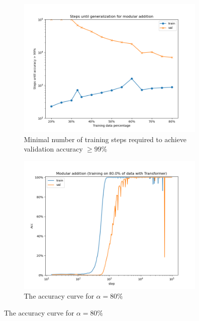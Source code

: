 \begin{figure}[!ht]
    \centering
    \begin{subfigure}[t]{0.3\textwidth}
        \includegraphics[width=\linewidth]{fig/Transformer_alpha/Transformer_alpha.png}
        \caption{Minimal number of training steps required to achieve validation accuracy $\geq 99\%$}
        \label{fig:transformer_alpha}
    \end{subfigure}
    \hfill %
    \begin{subfigure}[t]{0.3\textwidth}
        \includegraphics[width=\linewidth]{fig/grokking_curves/addition_80.0_Transformer_step.png}
        \caption{The accuracy curve for $\alpha = 80\%$}
        \label{fig:grokking_alpha_80}
    \end{subfigure}

\end{figure}
